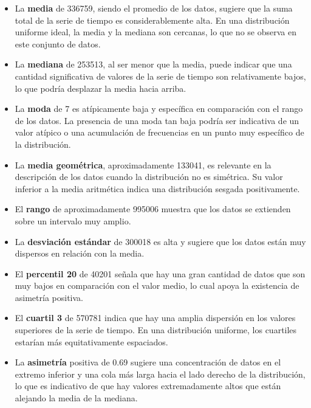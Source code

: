 \documentclass[11pt]{article} %
\begin{document}
	\begin{itemize}
		\item La \textbf{media} de 336759, siendo el promedio de los datos, sugiere que la suma total de la serie de tiempo es considerablemente alta. En una distribución uniforme ideal, la media y la mediana son cercanas, lo que no se observa en este conjunto de datos.
		
		\item La \textbf{mediana} de 253513, al ser menor que la media, puede indicar que una cantidad significativa de valores de la serie de tiempo son relativamente bajos, lo que podría desplazar la media hacia arriba.
		
		\item La \textbf{moda} de 7 es atípicamente baja y específica en comparación con el rango de los datos. La presencia de una moda tan baja podría ser indicativa de un valor atípico o una acumulación de frecuencias en un punto muy específico de la distribución.
		
		\item La \textbf{media geométrica}, aproximadamente 133041, es relevante en la descripción de los datos cuando la distribución no es simétrica. Su valor inferior a la media aritmética indica una distribución sesgada positivamente.
		
		\item El \textbf{rango} de aproximadamente 995006 muestra que los datos se extienden sobre un intervalo muy amplio.
		
		\item La \textbf{desviación estándar} de 300018 es alta y sugiere que los datos están muy dispersos en relación con la media.
		
		\item El \textbf{percentil 20} de 40201 señala que hay una gran cantidad de datos que son muy bajos en comparación con el valor medio, lo cual apoya la existencia de asimetría positiva.
		
		\item El \textbf{cuartil 3} de 570781 indica que hay una amplia dispersión en los valores superiores de la serie de tiempo. En una distribución uniforme, los cuartiles estarían más equitativamente espaciados.
		
		\item La \textbf{asimetría} positiva de 0.69 sugiere una concentración de datos en el extremo inferior y una cola más larga hacia el lado derecho de la distribución, lo que es indicativo de que hay valores extremadamente altos que están alejando la media de la mediana.
		

\end{itemize}
\end{document}
